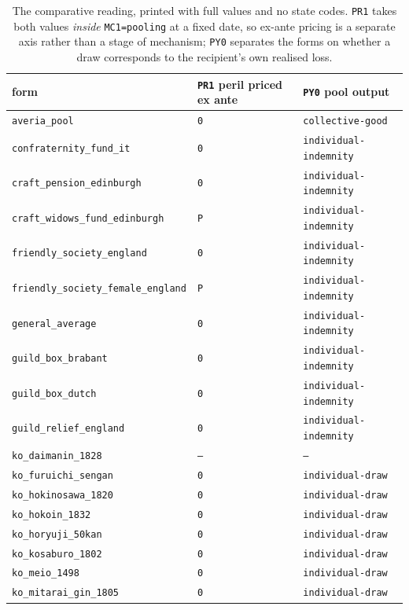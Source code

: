 \documentclass[11pt,a4paper]{article}
\begin{document}
\begin{table}[htbp]\centering\small
\caption{The comparative reading, printed with full values and no state codes. \texttt{PR1} takes both values \emph{inside} \texttt{MC1=pooling} at a fixed date, so ex-ante pricing is a separate axis rather than a stage of mechanism; \texttt{PY0} separates the forms on whether a draw corresponds to the recipient's own realised loss.}
\begin{tabular}{lll}
\toprule
form & \texttt{PR1} peril priced ex ante & \texttt{PY0} pool output \\
\midrule
\texttt{averia\_pool} & \texttt{0} & \texttt{collective-good} \\
\texttt{confraternity\_fund\_it} & \texttt{0} & \texttt{individual-indemnity} \\
\texttt{craft\_pension\_edinburgh} & \texttt{0} & \texttt{individual-indemnity} \\
\texttt{craft\_widows\_fund\_edinburgh} & \texttt{P} & \texttt{individual-indemnity} \\
\texttt{friendly\_society\_england} & \texttt{0} & \texttt{individual-indemnity} \\
\texttt{friendly\_society\_female\_england} & \texttt{P} & \texttt{individual-indemnity} \\
\texttt{general\_average} & \texttt{0} & \texttt{individual-indemnity} \\
\texttt{guild\_box\_brabant} & \texttt{0} & \texttt{individual-indemnity} \\
\texttt{guild\_box\_dutch} & \texttt{0} & \texttt{individual-indemnity} \\
\texttt{guild\_relief\_england} & \texttt{0} & \texttt{individual-indemnity} \\
\texttt{ko\_daimanin\_1828} & \texttt{--} & \texttt{--} \\
\texttt{ko\_furuichi\_sengan} & \texttt{0} & \texttt{individual-draw} \\
\texttt{ko\_hokinosawa\_1820} & \texttt{0} & \texttt{individual-draw} \\
\texttt{ko\_hokoin\_1832} & \texttt{0} & \texttt{individual-draw} \\
\texttt{ko\_horyuji\_50kan} & \texttt{0} & \texttt{individual-draw} \\
\texttt{ko\_kosaburo\_1802} & \texttt{0} & \texttt{individual-draw} \\
\texttt{ko\_meio\_1498} & \texttt{0} & \texttt{individual-draw} \\
\texttt{ko\_mitarai\_gin\_1805} & \texttt{0} & \texttt{individual-draw} \\

\end{tabular}
\end{table}
\end{document}
